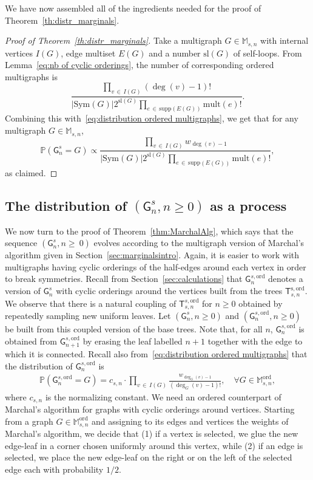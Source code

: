 \documentclass[AHL,Unicode,longabstracts,published]{cedram}
\newcommand{\abs}[1]{\left\lvert#1\right\rvert}
\newcommand{\Pp}[1]{\mathbb{P} \left(#1\right)}
\newcommand{\supp}{\mathrm{supp}}
\newcommand{\ord}{\mathrm{ord}}
\newcommand{\sll}{\mathrm{sl}}
\newcommand{\Sym}{\mathrm{Sym}}
\newcommand{\mult}{\mathrm{mult}}
\newcommand{\sG}{\mathsf{G}}
\newcommand{\sT}{\mathsf{T}}
\newcommand{\M}{\mathbb{M}}
\let\oldforall\forall
\renewcommand*{\forall}{\mathrel{\oldforall}}
\begin{document}

We have now assembled all of the ingredients needed for the proof of Theorem~\ref{th:distr_marginals}.

\begin{proof}[Proof of Theorem~\ref{th:distr_marginals}]
Take a multigraph $G\in \M_{s,n}$ with internal vertices $I(G)$, edge multiset $E(G)$ and a number $\sll(G)$ of self-loops. From Lemma~\ref{eq:nb of cyclic orderings}, the number of corresponding ordered multigraphs is
\begin{equation*}
\frac{\prod\limits_{v\,\in\,I(G)}\left(\deg(v)-1\right)!}{\abs{\Sym(G)}2^{\sll(G)}\prod\limits_{e\,\in\,\supp(E(G))}\mult(e)!}.
\end{equation*}
Combining this with~\eqref{eq:distribution ordered multigraphs}, we get that for any multigraph $G\in \M_{s,n}$,
\[
\Pp{\sG^s_{n}=G}\propto\frac{\prod\limits_{v\,\in\,I(G)} w_{\deg(v)-1}}{\abs{\Sym(G)}2^{\sll(G)}\prod\limits_{e\,\in\,\supp(E(G))}\mult(e)!},
\]
as claimed.
\end{proof}

\subsection{The distribution of \texorpdfstring{$(\sG^s_{n}, n \ge 0)$}{(sGsn, n >= 0)} as a process}\label{sec:Marchal}

We now turn to the proof of Theorem~\ref{thm:MarchalAlg}, which says that the sequence $(\sG^s_{n},n\geq~0)$ evolves according to the multigraph version of Marchal's algorithm given in Section~\ref{sec:marginalsintro}. Again, it is easier to work with multigraphs having cyclic orderings of the half-edges around each vertex in order to break symmetries. Recall from Section~\ref{sec:calculations} that $\sG^{s,\ord}_{n}$ denotes a version of $\sG^{s}_n$ with cyclic orderings around the vertices built from the trees $\sT^{\mathrm{s,ord}}_{s,n}$. We observe that there is a natural coupling of $\sT_{s,n}^{s,\ord}$ for $n \ge 0$ obtained by repeatedly sampling new uniform leaves. Let $(\sG^{s}_n, n\geq 0)$ and $(\sG^{s,\ord}_{n}, n\geq 0)$ be built from this coupled version of the base trees. Note that, for all $n$, $\sG^{s,\ord}_{n}$ is obtained from $\sG^{s,\ord}_{n+1}$ by erasing the leaf labelled $n+1$ together with the edge to which it is connected. Recall also from~\eqref{eq:distribution ordered multigraphs} that the distribution of $\sG^{s,\ord}_{n}$ is
\begin{align*}
\Pp{\sG_{n}^{s,\ord}=G}=c_{s,n}\cdot \prod_{v\,\in\, I(G)}\frac{w_{\deg_G(v)-1}}{\left(\deg_G(v)-1\right)!}, \quad \forall G \in \M_{s,n}^{\ord},
\end{align*}
where $c_{s,n}$ is the normalizing constant. We need an ordered counterpart of Marchal's algorithm for graphs with cyclic orderings around vertices. Starting from a graph $G\in\M_{s,n}^{\ord}$ and assigning to its edges and vertices the weights of Marchal's algorithm, we decide that (1) if a vertex is selected, we glue the new edge-leaf in a corner chosen uniformly around this vertex, while (2) if an edge is selected, we place the new edge-leaf on the right or on the left of the selected edge each with probability $1/2$.
\end{document}
